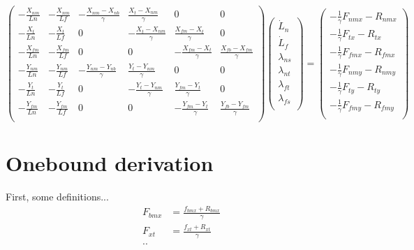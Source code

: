 \documentclass[11pt,twocolumn]{article}
\begin{document}
\[
\begin{pmatrix}
  -\frac{X_{nm}}{Ln} & -\frac{X_{nm}}{Lf}
  & -\frac{X_{nm}-X_{nb}}{\gamma} & \frac{X_{t}-X_{nm}}{\gamma} & 0 & 0\\
  -\frac{X_{t}}{Ln} & -\frac{X_{t}}{Lf}
  & 0 & -\frac{X_{t}-X_{nm}}{\gamma} & \frac{X_{fm}-X_{t}}{\gamma} & 0\\
  -\frac{X_{fm}}{Ln} & -\frac{X_{fm}}{Lf}
  & 0 & 0 & -\frac{X_{fm}-X_{t}}{\gamma} & \frac{X_{fb}-X_{fm}}{\gamma}\\
  -\frac{Y_{nm}}{Ln} & -\frac{Y_{nm}}{Lf}
  & -\frac{Y_{nm}-Y_{nb}}{\gamma} & \frac{Y_{t}-Y_{nm}}{\gamma} & 0 & 0\\
  -\frac{Y_{t}}{Ln} & -\frac{Y_{t}}{Lf}
  & 0 & -\frac{Y_{t}-Y_{nm}}{\gamma} & \frac{Y_{fm}-Y_{t}}{\gamma} & 0\\
  -\frac{Y_{fm}}{Ln} & -\frac{Y_{fm}}{Lf}
  & 0 & 0 & -\frac{Y_{fm}-Y_{t}}{\gamma} & \frac{Y_{fb}-Y_{fm}}{\gamma}\\
\end{pmatrix}
\begin{pmatrix}
  \dot{L}_n\\
  \dot{L}_f\\
  \lambda_{ns}\\
  \lambda_{nt}\\
  \lambda_{ft}\\
  \lambda_{fs}\\
\end{pmatrix}
=
\begin{pmatrix}
  -\frac{1}{\gamma}F_{nmx} - R_{nmx}\\
  -\frac{1}{\gamma}F_{tx}  - R_{tx}\\
  -\frac{1}{\gamma}F_{fmx} - R_{fmx}\\
  -\frac{1}{\gamma}F_{nmy} - R_{nmy}\\
  -\frac{1}{\gamma}F_{ty}  - R_{ty}\\
  -\frac{1}{\gamma}F_{fmy} - R_{fmy}\\
\end{pmatrix}
\]

\section{Onebound derivation}

First, some definitions...
\begin{align*}
F_{bmx} &= \frac{f_{bmx} + R_{bmx}}{\gamma}\\
F_{xt } &= \frac{f_{xt} + R_{xt}}{\gamma}\\
..\\
\end{align*}
\end{document}
